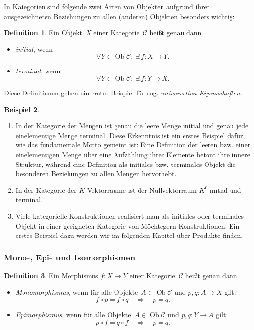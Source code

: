 \documentclass[a4paper,ngerman]{scrartcl}
\theoremstyle{definition}
\newtheorem{defn}{Definition}[section]
\newtheorem{bsp}[defn]{Beispiel}
\theoremstyle{plain}
\theoremstyle{remark}
\newcommand{\C}{\mathcal{C}}
\DeclareMathOperator{\Ob}{Ob}
\begin{document}
In Kategorien sind folgende zwei Arten von Objekten aufgrund ihrer
ausgezeichneten Beziehungen zu allen (anderen) Objekten besonders wichtig:
\begin{defn}
Ein Objekt~$X$ einer Kategorie~$\C$ heißt genau dann
\begin{itemize}
  \item \emph{initial}, wenn
    \[ \forall Y \in \Ob \C{:}\ \exists! f : X \to Y. \]
  \item \emph{terminal}, wenn
    \[ \forall Y \in \Ob \C{:}\ \exists! f : Y \to X. \]
\end{itemize}
\end{defn}
Diese Definitionen geben ein erstes Beispiel für sog. \emph{universellen
Eigenschaften}.

\begin{bsp}\begin{enumerate}
\item In der Kategorie der Mengen ist genau die leere Menge initial und
genau jede einelementige Menge terminal. Diese Erkenntnis ist ein erstes
Beispiel dafür, wie das fundamentale Motto gemeint ist: Eine Definition der
leeren bzw. einer einelementigen Menge über eine Aufzählung ihrer Elemente
betont ihre innere Struktur, während eine Definition als initiales bzw.
terminales Objekt die besonderen Beziehungen zu allen Mengen hervorhebt.
\item In der Kategorie der $K$-Vektorräume ist der Nullvektorraum $K^0$ initial
und terminal.
\item Viele kategorielle Konstruktionen realisiert man als initiales oder
terminales Objekt in einer geeigneten Kategorie von Möchtegern-Konstruktionen.
Ein erstes Beispiel dazu werden wir im folgenden Kapitel über Produkte finden.
\end{enumerate}\end{bsp}


\subsubsection*{Mono-, Epi- und Isomorphismen}

\begin{defn}
Ein Morphismus $f:X \to Y$ einer Kategorie~$\C$ heißt genau dann
\begin{itemize}
  \item \emph{Monomorphismus}, \tabto{3.35cm}wenn für alle Objekte~$A \in \Ob \C$
  und $p,q:A \to X$ gilt:
  \[ f \circ p = f \circ q \quad\Longrightarrow\quad p = q. \]
  \item \emph{Epimorphismus}, \tabto{3.35cm}wenn für alle Objekte~$A \in \Ob \C$
  und $p,q:Y \to A$ gilt:
  \[ p \circ f = q \circ f \quad\Longrightarrow\quad p = q. \]
\end{itemize}
\end{defn}
\end{document}
